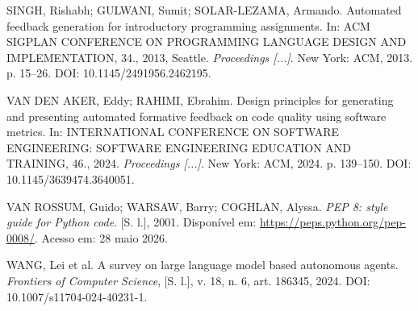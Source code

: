 \documentclass[12pt]{article}
\begin{document}
\begin{thebibliography}{}
SINGH, Rishabh; GULWANI, Sumit; SOLAR-LEZAMA, Armando. Automated feedback
generation for introductory programming assignments. In: ACM SIGPLAN CONFERENCE
ON PROGRAMMING LANGUAGE DESIGN AND IMPLEMENTATION, 34., 2013, Seattle.
\textit{Proceedings [...]}. New York: ACM, 2013. p. 15--26.
DOI: 10.1145/2491956.2462195.

VAN DEN AKER, Eddy; RAHIMI, Ebrahim. Design principles for generating and
presenting automated formative feedback on code quality using software metrics.
In: INTERNATIONAL CONFERENCE ON SOFTWARE ENGINEERING: SOFTWARE ENGINEERING
EDUCATION AND TRAINING, 46., 2024. \textit{Proceedings [...]}. New York: ACM,
2024. p. 139--150. DOI: 10.1145/3639474.3640051.

VAN ROSSUM, Guido; WARSAW, Barry; COGHLAN, Alyssa. \textit{PEP 8: style guide
for Python code}. [S. l.], 2001. Disponível em:
\url{https://peps.python.org/pep-0008/}. Acesso em: 28 maio 2026.

WANG, Lei et al. A survey on large language model based autonomous agents.
\textit{Frontiers of Computer Science}, [S. l.], v. 18, n. 6, art. 186345,
2024. DOI: 10.1007/s11704-024-40231-1.

\end{thebibliography}
\end{document}
